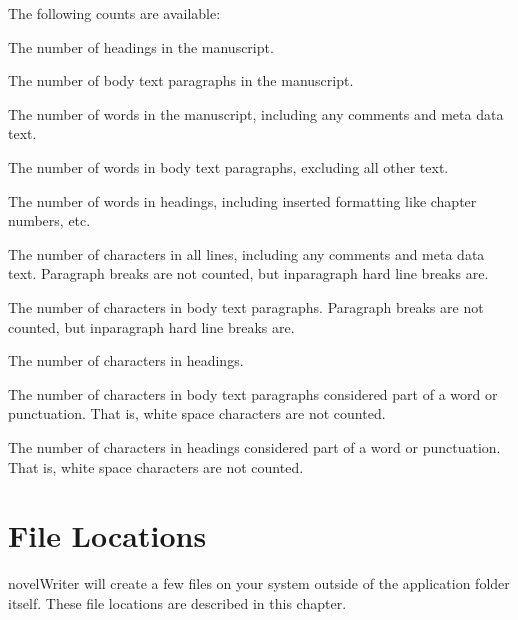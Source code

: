 \documentclass[a4paper,11pt,english]{sphinxmanual}
\begin{document}
\sphinxAtStartPar
The following counts are available:
\begin{description}
\sphinxAtStartPar
The number of headings in the manuscript.

\sphinxAtStartPar
The number of body text paragraphs in the manuscript.

\sphinxAtStartPar
The number of words in the manuscript, including any comments and meta data text.

\sphinxAtStartPar
The number of words in body text paragraphs, excluding all other text.

\sphinxAtStartPar
The number of words in headings, including inserted formatting like chapter numbers, etc.

\sphinxAtStartPar
The number of characters in all lines, including any comments and meta data text. Paragraph
breaks are not counted, but in\sphinxhyphen{}paragraph hard line breaks are.

\sphinxAtStartPar
The number of characters in body text paragraphs. Paragraph breaks are not counted, but
in\sphinxhyphen{}paragraph hard line breaks are.

\sphinxAtStartPar
The number of characters in headings.

\sphinxAtStartPar
The number of characters in body text paragraphs considered part of a word or punctuation. That
is, white space characters are not counted.

\sphinxAtStartPar
The number of characters in headings considered part of a word or punctuation. That is, white
space characters are not counted.

\end{description}

\sphinxstepscope


\chapter{File Locations}
\label{\detokenize{tech_locations:file-locations}}\label{\detokenize{tech_locations:a-locations}}\label{\detokenize{tech_locations::doc}}
\sphinxAtStartPar
novelWriter will create a few files on your system outside of the application folder itself. These
file locations are described in this chapter.
\end{document}

